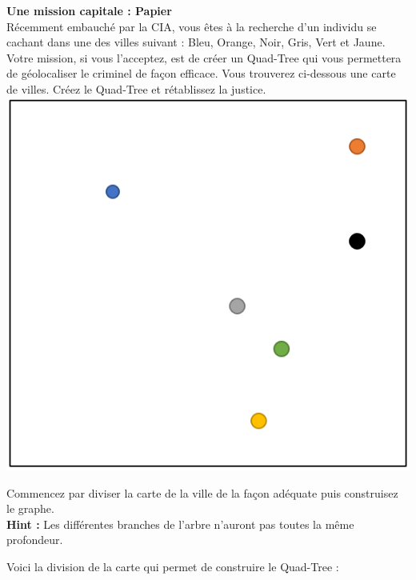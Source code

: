 \begin{Exercice}[10 minutes]\textbf{Une mission capitale : Papier}\\

Récemment embauché par la CIA, vous êtes à la recherche d'un individu se cachant dans une des villes suivant : Bleu, Orange, Noir, Gris, Vert et Jaune. Votre mission, si vous l'acceptez, est de créer un Quad-Tree qui vous permettera de géolocaliser le criminel de façon efficace. Vous trouverez ci-dessous une carte de villes. Créez le Quad-Tree et rétablissez la justice.\\

\includegraphics[]{Quad-Tree 3.PNG}
\begin{conseil}
    Commencez par diviser la carte de la ville de la façon adéquate puis construisez le graphe.\\
    
    \textbf{Hint : }Les différentes branches de l'arbre n'auront pas toutes la même profondeur.
\end{conseil}
\begin{solution}
    Voici la division de la carte qui permet de construire le Quad-Tree :\\
    

\end{solution}
\end{Exercice}
